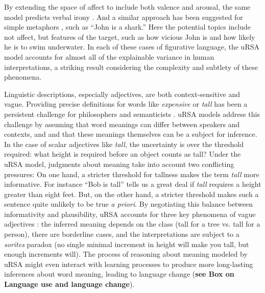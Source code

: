 \documentclass[]{elsarticle}
\begin{document}
By extending
the space of affect to include both valence and arousal, the same model predicts verbal irony \citep{kao2015}. 
And a similar approach has been suggested for simple
metaphors \citep{kao2014b}, such as ``John is a shark.''
Here the potential topics include not affect, but features of the
target, such as how vicious John is and how likely he is to swim
underwater. In each of these cases of figurative language, the uRSA model accounts for almost all of the explainable variance in
human interpretations, a striking result considering the complexity and subtlety of these phenomena.

Linguistic descriptions, especially adjectives, are both context-sensitive and vague. Providing precise definitions for words like \emph{expensive} or \emph{tall} has been a persistent challenge for philosophers and semanticists \citep{williamson2002}. uRSA models address this challenge by assuming that word meanings can differ between speakers and contexts, and and that these meanings themselves can be a subject for inference. In the case of scalar adjectives like \emph{tall}, the uncertainty is over the threshold required: what height is required before an object counts as tall?
Under the uRSA model, judgments about meaning take into account two conflicting pressures: On one hand, a stricter threshold for tallness makes the term \emph{tall} more informative. For instance ``Bob is tall'' tells us a great deal if \emph{tall} requires a height greater than eight feet. But, on the other hand, a stricter threshold makes such a sentence quite unlikely to be true \emph{a priori}.
By negotiating this balance between informativity and plausibility, uRSA accounts for three key phenomena of vague adjectives \citep{lassiter2015}: the inferred meaning depends on the class (tall for a tree vs. tall for a person), there are borderline cases, and the interpretations are subject to a \emph{sorites} paradox (no single minimal increment in height will make you tall, but enough increments will). The process of reasoning about meaning modeled by uRSA might even interact with learning processes to produce more long-lasting inferences about word meaning, leading to language change (\textbf{see Box on Language use and language change}).



\end{document}
